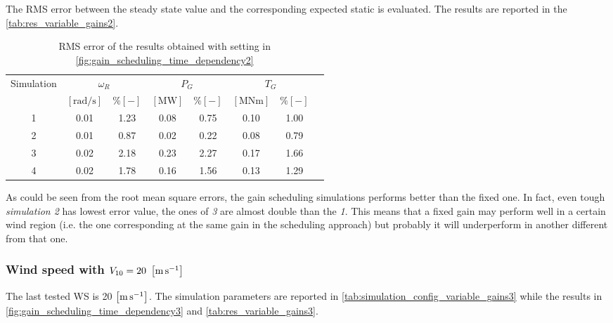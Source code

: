 The \acrshort{RMS} error between the steady state value and the corresponding expected static is evaluated. The results are reported in the \autoref{tab:res_variable_gains2}.
\begin{table}[htb]
  \caption{RMS error of the results obtained with setting in \autoref{fig:gain_scheduling_time_dependency2}}
  \centering
  \begin{tabular}{cccccccc}
    \toprule
      Simulation & \multicolumn{2}{c}{$\omega_R$} & \multicolumn{2}{c}{$P_G$} & \multicolumn{2}{c}{$T_G$} \\ 
       & $\left[\si{\radian\per\second}\right]$ & $ \% \left[-\right]$ & $\left[\si{\mega\watt}\right]$ & $ \% \left[-\right]$ & $\left[\si{\mega\newton\meter} \right]$ & $ \% \left[-\right]$ \\ \midrule      
     1 & 0.01 &  1.23 &  0.08  &  0.75  &  0.10  &  1.00 \\
     2 & 0.01 &  0.87 &  0.02  &  0.22  &  0.08  &  0.79 \\
     3 & 0.02 &  2.18 &  0.23  &  2.27  &  0.17  &  1.66 \\
     4 & 0.02 &  1.78 &  0.16  &  1.56  &  0.13  &  1.29 \\
    
     \bottomrule
  \end{tabular}
  \label{tab:res_variable_gains2}
\end{table}

As could be seen from the root mean square errors, the gain scheduling simulations performs better than the fixed one. In fact, even tough \textit{simulation 2} has lowest error value, the ones of \textit{3} are almost double than the \textit{1}. This means that a fixed gain may perform well in a certain wind region (i.e. the one corresponding at the same gain in the scheduling approach) but probably it will underperform in another different from that one.  

\subsubsection{Wind speed with $V_{10} =  20 \ \mesunt{\meter\per\second}$}
The last tested \acrshort{WS} is 20 $\left[\si{\meter\per\second}\right]$. The simulation parameters are reported in \autoref{tab:simulation_config_variable_gains3} while the results in \autoref{fig:gain_scheduling_time_dependency3} and \autoref{tab:res_variable_gains3}.


